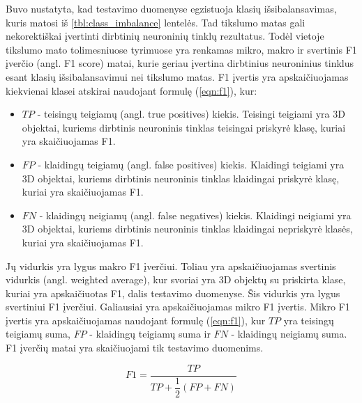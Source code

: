 Buvo nustatyta, kad testavimo duomenyse egzistuoja klasių išsibalansavimas, kuris matosi iš \ref{tbl:class_imbalance} lentelės. Tad tikslumo matas gali nekorektiškai įvertinti dirbtinių neuroninių tinklų rezultatus. Todėl vietoje tikslumo mato tolimesniuose tyrimuose yra renkamas mikro, makro ir svertinis F1 įverčio (angl. F1 score) matai, kurie geriau įvertina dirbtinius neuroninius tinklus esant klasių išsibalansavimui nei tikslumo matas. F1 įvertis yra apskaičiuojamas kiekvienai klasei atskirai naudojant formulę (\ref{eqn:f1}), kur:

\begin{itemize}
	\item $TP$ - teisingų teigiamų (angl. true positives) kiekis. Teisingi teigiami yra 3D objektai, kuriems dirbtinis neuroninis tinklas teisingai priskyrė klasę, kuriai yra skaičiuojamas F1.
	\item $FP$ - klaidingų teigiamų (angl. false positives) kiekis. Klaidingi teigiami yra 3D objektai, kuriems dirbtinis neuroninis tinklas klaidingai priskyrė klasę, kuriai yra skaičiuojamas F1.
	\item $FN$ - klaidingų neigiamų (angl. false negatives) kiekis. Klaidingi neigiami yra 3D objektai, kuriems dirbtinis neuroninis tinklas klaidingai nepriskyrė klasės, kuriai yra skaičiuojamas F1.
\end{itemize}

Jų vidurkis yra lygus makro F1 įverčiui. Toliau yra apskaičiuojamas svertinis vidurkis (angl. weighted average), kur svoriai yra 3D objektų su priskirta klase, kuriai yra apskaičiuotas F1, dalis testavimo duomenyse. Šis vidurkis yra lygus svertiniui F1 įverčiui. Galiausiai yra apskaičiuojamas mikro F1 įvertis. Mikro F1 įvertis yra apskaičiuojamas naudojant formulę (\ref{eqn:f1}), kur $TP$ yra teisingų teigiamų suma, $FP$ - klaidingų teigiamų suma ir $FN$ - klaidingų neigiamų suma. F1 įverčių matai yra skaičiuojami tik testavimo duomenims.

\begin{equation}
\label{eqn:f1}
	F1 = \dfrac{TP}{TP + \dfrac{1}{2}(FP + FN)}
\end{equation}

